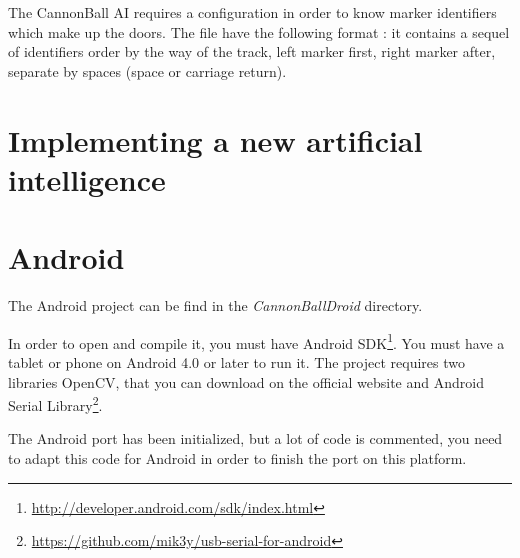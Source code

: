 \documentclass[a4paper,11pt]{report}
\begin{document}
The CannonBall AI requires a configuration in order to know marker identifiers
which make up the doors.  The file have the following format : it contains a
sequel of identifiers order by the way of the track, left marker first, right
marker after, separate by spaces (space or carriage return).

\section{Implementing a new artificial intelligence}

\section{Android}

The Android project can be find in the \emph{CannonBallDroid} directory.

In order to open and compile it, you must have Android
SDK\footnote{\url{http://developer.android.com/sdk/index.html}}.
You must have a tablet or phone on Android 4.0 or later to run it.
The project requires two libraries OpenCV, that you can download on the
official website and Android Serial
Library\footnote{\url{https://github.com/mik3y/usb-serial-for-android}}.

The Android port has been initialized, but a lot of code is commented, you
need to adapt this code for Android in order to finish the port on this
platform.
\end{document}
